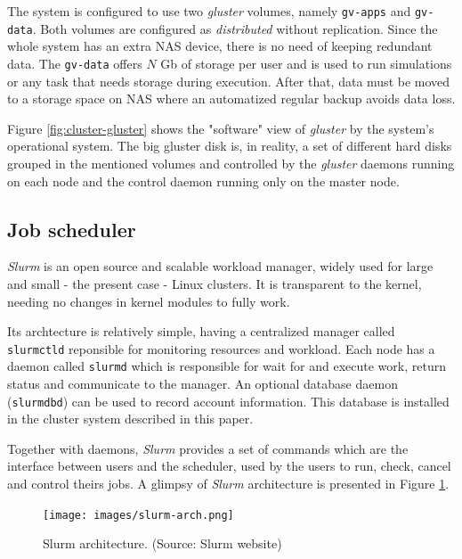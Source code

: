 \documentclass[twoside,a4paper,12pt,english]{inac19}
\begin{document}
The system is configured to use two \textit{gluster} volumes, namely \texttt{gv-apps} and \texttt{gv-data}. Both volumes
are configured as \textit{distributed} without replication. Since the whole system has an extra NAS device, there is
no need of keeping redundant data. The \texttt{gv-data} offers $N$ Gb of storage per user and is used to run simulations or any task that needs storage during execution. After that, data must be moved to a storage space on NAS where an automatized regular backup avoids data loss.

Figure \ref{fig:cluster-gluster} shows the "software" view of \textit{gluster} by the system's operational system. The big 
gluster disk is, in reality, a set of different hard disks grouped in the mentioned volumes and controlled by the 
\textit{gluster} daemons running on each node and the control daemon running only on the master node.

\subsection{Job scheduler}
\label{ssec:slurm}

\textit{Slurm} \cite{slurm} is an open source and scalable workload manager, widely used for large
and small - the present case - Linux clusters. It is transparent to the kernel, needing no changes in
kernel modules to fully work.

Its archtecture is relatively simple, having a centralized manager called \texttt{slurmctld} reponsible for
monitoring resources and workload. Each node has a daemon called \texttt{slurmd} which is responsible for
wait for and execute work, return status and communicate to the manager. An optional database daemon
(\texttt{slurmdbd}) can be used to record account information. This database is installed in the cluster
system described in this paper.

Together with daemons, \textit{Slurm} provides a set of commands which are the interface between users
and the scheduler, used by the users to run, check, cancel and control theirs jobs. A glimpsy of \textit{Slurm}
architecture is presented in Figure \ref{fig:slurm}.

\begin{figure}[h] %
  \centering\texttt{[image: images/slurm-arch.png]}
  \caption{Slurm architecture. (Source: Slurm website)}
  \label{fig:slurm}
\end{figure}
\end{document}
